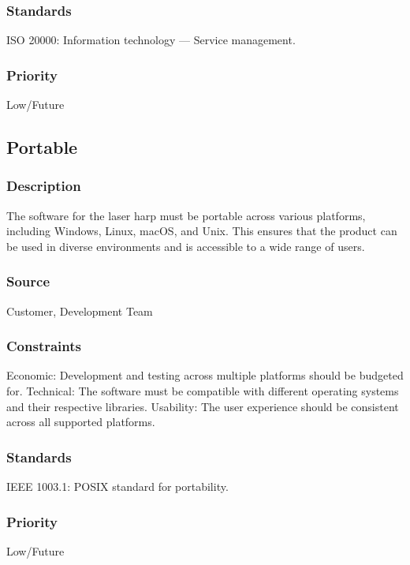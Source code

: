 \subsubsection{Standards}
ISO 20000: Information technology — Service management.
\subsubsection{Priority}
Low/Future


\subsection{Portable}
\subsubsection{Description}
The software for the laser harp must be portable across various platforms, including Windows, Linux, macOS, and Unix. This ensures that the product can be used in diverse environments and is accessible to a wide range of users.
\subsubsection{Source}
Customer, Development Team
\subsubsection{Constraints}
Economic: Development and testing across multiple platforms should be budgeted for.
Technical: The software must be compatible with different operating systems and their respective libraries.
Usability: The user experience should be consistent across all supported platforms.
\subsubsection{Standards}
IEEE 1003.1: POSIX standard for portability.
\subsubsection{Priority}
Low/Future
